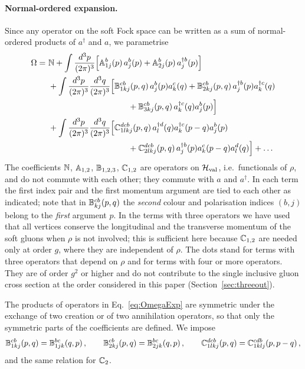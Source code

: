 \paragraph{Normal-ordered expansion.} Since any operator on the soft Fock space can be written as a sum of normal-ordered products of $a^\dagger$ and $a$, we parametrise
\begin{align}\label{eq:OmegaExp}
\Omega = \ &\mf{N}
+\int\frac{d^3p}{(2\pi)^3}\Big[\mf{A}^b_{1j}(p)\,a^b_j(p)+\mf{A}^b_{2j}(p)\,a^{\dagger b}_j(p)\Big]
\notag\\&
+\int\frac{d^3p}{(2\pi)^3}\frac{d^3q}{(2\pi)^3}\Big[\mf{B}^{cb}_{1kj}(p,q)\,a^b_j(p)a^c_k(q)+\mf{B}^{cb}_{2kj}(p,q)\,a^{\dagger b}_j(p)a^{\dagger c}_k(q)
\notag\\&\hspace{3.4cm}+\mf{B}^{cb}_{3kj}(p,q)\,a^{\dagger c}_k(q)a^b_j(p)\Big]
\notag\\&
+\int\frac{d^3p}{(2\pi)^3}\frac{d^3q}{(2\pi)^3}\Big[\mf{C}^{dcb}_{1lkj}(p,q)\,a^{\dagger d}_l(q)a^{\dagger c}_k(p-q)a^b_j(p)
\notag\\&\hspace{3.4cm}+\mf{C}^{dcb}_{2lkj}(p,q)\,a^{\dagger b}_j(p)a^c_k(p-q)a^d_l(q)\Big]+\dots
\end{align}
The coefficients $\mathbb{N}$, $\mathbb{A}_{1,2}$, $\mathbb{B}_{1,2,3}$, $\mathbb{C}_{1,2}$ are operators on $\mathcal H_{\rm val}$, i.e.\ functionals of $\rho$, and do not commute with each other; they commute with $a$ and $a^\dagger$. In each term the first index pair and the first momentum argument are tied to each other as indicated; note that in $\mathbb{B}^{cb}_{kj}(p,q)$ the \emph{second} colour and polarisation indices $(b,j)$ belong to the \emph{first} argument $p$. In the terms with three operators we have used that all vertices conserve the longitudinal and the transverse momentum of the soft gluons when $\rho$ is not involved; this is sufficient here because $\mathbb{C}_{1,2}$ are needed only at order $g$, where they are independent of $\rho$. The dots stand for terms with three operators that depend on $\rho$ and for terms with four or more operators. They are of order $g^2$ or higher and do not contribute to the single inclusive gluon cross section at the order considered in this paper (Section~\ref{sec:threeout}).

The products of operators in Eq.~\eqref{eq:OmegaExp} are symmetric under the exchange of two creation or of two annihilation operators, so that only the symmetric parts of the coefficients are defined. We impose
\begin{align}\label{eq:symm}
\mathbb{B}^{cb}_{1kj}(p,q)=\mathbb{B}^{bc}_{1jk}(q,p)\,,\qquad \mathbb{B}^{cb}_{2kj}(p,q)=\mathbb{B}^{bc}_{2jk}(q,p)\,,\qquad
\mathbb{C}^{dcb}_{1lkj}(p,q)=\mathbb{C}^{cdb}_{1klj}(p,p-q)\,,
\end{align}
and the same relation for $\mathbb{C}_2$.

